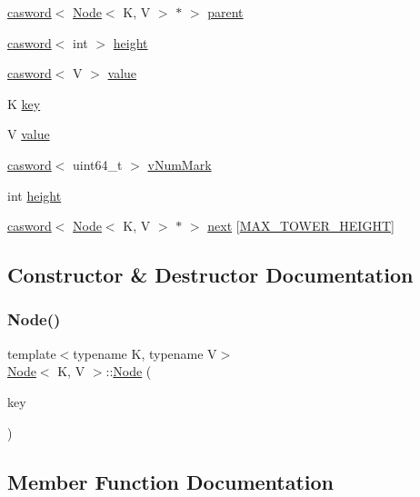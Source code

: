 \begin{DoxyCompactItemize}
\item 
\hyperlink{structcasword}{casword}$<$ \hyperlink{classNode}{Node}$<$ K, V $>$ $\ast$ $>$ \hyperlink{classNode_a6393b3996b6bbae601841635eafad7a4}{parent}
\item 
\hyperlink{structcasword}{casword}$<$ int $>$ \hyperlink{classNode_aa416d66d3fba99e844a02109fe8e2419}{height}
\item 
\hyperlink{structcasword}{casword}$<$ V $>$ \hyperlink{classNode_afb1f58df40fc63f650d0ba9eb165cdb4}{value}
\item 
K \hyperlink{classNode_a4091ccbd4f0b78711f848a5129fdece9}{key}
\item 
V \hyperlink{classNode_ad26872ac51fa4ef5a8519038472a5050}{value}
\item 
\hyperlink{structcasword}{casword}$<$ uint64\+\_\+t $>$ \hyperlink{classNode_a3f9e4ea9fc73761a06375bb5f3ebcd60}{v\+Num\+Mark}
\item 
int \hyperlink{classNode_ad8e961cf89a9b9f8e21f648c6ffb06ff}{height}
\item 
\hyperlink{structcasword}{casword}$<$ \hyperlink{classNode}{Node}$<$ K, V $>$ $\ast$ $>$ \hyperlink{classNode_a1f772846cd18db8938fbae6de5970941}{next} \mbox{[}\hyperlink{skiplist_8h_a6e5496d00878dd64264b713699766bdb}{M\+A\+X\+\_\+\+T\+O\+W\+E\+R\+\_\+\+H\+E\+I\+G\+HT}\mbox{]}
\end{DoxyCompactItemize}


\subsection{Constructor \& Destructor Documentation}
\mbox{\label{classNode_ab18e92edaff4f5aaca9b3ad9fc3a48da}} 
\subsubsection{\texorpdfstring{Node()}{Node()}}
{\footnotesize\ttfamily template$<$typename K, typename V$>$ \\
\hyperlink{classNode}{Node}$<$ K, V $>$\+::\hyperlink{classNode}{Node} (\begin{DoxyParamCaption}\item[{int}]{key }\end{DoxyParamCaption})\hspace{0.3cm}{\ttfamily [inline]}}



\subsection{Member Function Documentation}
\mbox{\label{classNode_a24324cc23f7c3377c7b2b9ff71a1c0f6}} 
